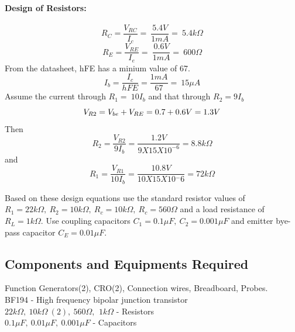 \documentclass{book}
\begin{document}
\paragraph{Design of Resistors:}
\begin{equation}
R_C=\frac{V_{RC}}{I_c}=\ \frac{5.4V}{1mA}=\ 5.4 k\Omega
\end{equation}
\begin{equation}
R_E=\frac{V_{RE}}{I_e}=\ \frac{0.6V}{1mA}=\ 600\Omega
\end{equation}
\noindent From the datasheet, hFE has a minium value of 67. 
\begin{equation}
I_b=\frac{I_c}{hFE}=\frac{1mA}{67}=\ 15 \mu A
\end{equation}
\noindent Assume the current through $R_1=\ 10 I_b$ and that through $R_2=9I_b$ 
\begin{equation}
 V_{R2}=V_{be}+V_{RE}\\ =0.7+0.6V=1.3V
\end{equation}
\noindent Then
\begin{equation}
R_2=\frac{V_{R2}}{9I_b}=\frac{1.2V}{9X15X10^{-6}}=8.8 k\Omega
\end{equation}
\noindent and 
\begin{equation}
R_1=\frac{V_{R1}}{10I_b}=\frac{10.8V}{10X15X10{^-6}}= 72k\Omega
\end{equation}

\noindent Based on these design equations use the standard resistor values of $R_1=22k\Omega,\ R_2=10k\Omega, \ R_c=10k\Omega,\ R_c=560\Omega$ and a load resistance of $R_L=1k\Omega$.
Use coupling capacitors $C_1=0.1 \mu F,\ C_2=0.001\mu F$ and emitter bye-pass capacitor $C_E=0.01\mu F$.
\subsection*{Components and Equipments Required}
Function Generators(2), CRO(2), Connection wires, Breadboard, Probes.
\\BF194 - High frequency bipolar junction transistor
\\ $22k\Omega,\  10k\Omega\ (2),\ 560\Omega,\,\ 1k\Omega $ - Resistors
\\ $ 0.1\mu F,\ 0.01\mu F, \ 0.001\mu F $ - Capacitors
\\ 
\end{document}
